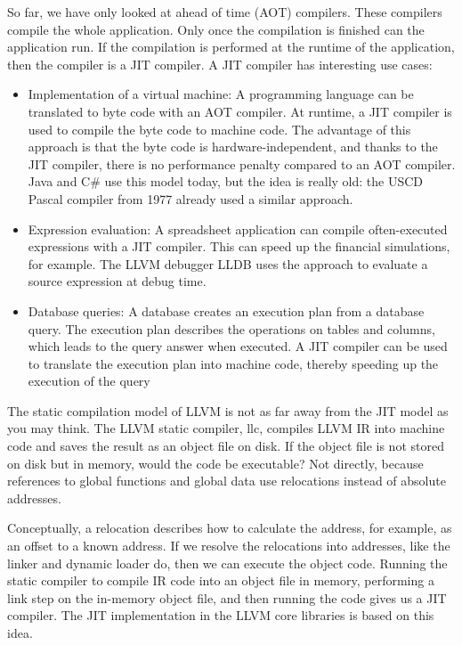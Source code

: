 So far, we have only looked at ahead of time (AOT) compilers. These compilers compile the whole application. Only once the compilation is finished can the application run. If the compilation is performed at the runtime of the application, then the compiler is a JIT compiler. A JIT compiler has interesting use cases:\par

\begin{itemize}
\item Implementation of a virtual machine: A programming language can be translated to byte code with an AOT compiler. At runtime, a JIT compiler is used to compile the byte code to machine code. The advantage of this approach is that the byte code is hardware-independent, and thanks to the JIT compiler, there is no performance penalty compared to an AOT compiler. Java and C\# use this model today, but the idea is really old: the USCD Pascal compiler from 1977 already used a similar approach.

\item Expression evaluation: A spreadsheet application can compile often-executed expressions with a JIT compiler. This can speed up the financial simulations, for example. The LLVM debugger LLDB uses the approach to evaluate a source expression at debug time.

\item Database queries: A database creates an execution plan from a database query. The execution plan describes the operations on tables and columns, which leads to the query answer when executed. A JIT compiler can be used to translate the execution plan into machine code, thereby speeding up the execution of the query
\end{itemize}

The static compilation model of LLVM is not as far away from the JIT model as you may think. The LLVM static compiler, llc, compiles LLVM IR into machine code and saves the result as an object file on disk. If the object file is not stored on disk but in memory, would the code be executable? Not directly, because references to global functions and global data use relocations instead of absolute addresses.\par

Conceptually, a relocation describes how to calculate the address, for example, as an offset to a known address. If we resolve the relocations into addresses, like the linker and dynamic loader do, then we can execute the object code. Running the static compiler to compile IR code into an object file in memory, performing a link step on the in-memory object file, and then running the code gives us a JIT compiler. The JIT implementation in the LLVM core libraries is based on this idea.\par

